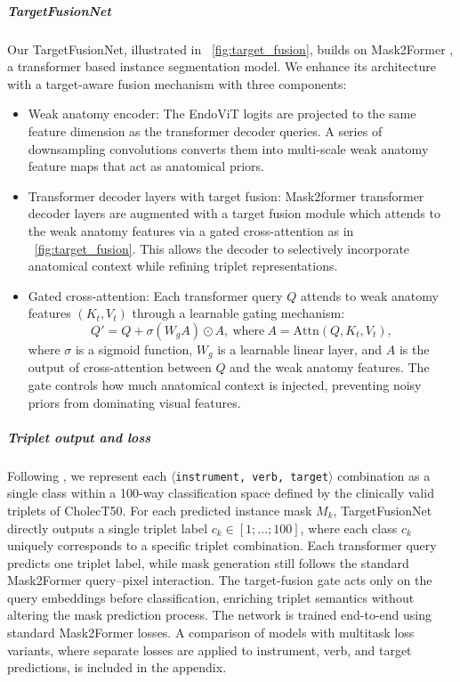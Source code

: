 \documentclass[pdflatex,sn-mathphys-num]{sn-jnl}%
\newcommand{\ivttriplet}{\texttt{$\langle$instrument, verb, target$\rangle$}\xspace}
\newcommand{\anatprior}{weak anatomy\xspace}
\newcommand{\Anatprior}{Weak anatomy\xspace}
\newcommand{\figref}[1]{\figurename~\ref{#1}}
\newcommand{\mysubsection}[1]{\subparagraph{#1}}
\theoremstyle{thmstyleone}%
\theoremstyle{thmstyletwo}%
\theoremstyle{thmstylethree}%
\begin{document}
\mysubsection{TargetFusionNet}\label{sec:targetfusionnet}
Our TargetFusionNet, illustrated in \figref{fig:target_fusion}, builds on Mask2Former \cite{cheng2022masked}, a transformer based instance segmentation model. 
We enhance its architecture with a target-aware fusion mechanism with three components:
%
\begin{itemize}
    \item \Anatprior encoder: The EndoViT logits are projected to the same feature dimension as the transformer decoder queries. A series of downsampling convolutions converts them into multi-scale \anatprior feature maps that act as anatomical priors.
    
    \item Transformer decoder layers with target fusion: Mask2former transformer decoder layers are augmented with a target fusion module which attends to the \anatprior features via a gated cross-attention as in \figref{fig:target_fusion}. This allows the decoder to selectively incorporate anatomical context while refining triplet representations.
    
    \item Gated cross-attention: Each transformer query \( Q \) attends to \anatprior features \( (K_t, V_t) \) through a learnable gating mechanism:
    \[
    Q' = Q + \sigma(W_g A) \odot A,
    ~ \mathrm{where} ~  A = \mathrm{Attn}(Q, K_t, V_t),
    \]
    where \( \sigma \) is a sigmoid function, \( W_g \) is a learnable linear layer, and \( A \) is the output of cross-attention between \( Q \) and the \anatprior features. The gate controls how much anatomical context is injected, preventing noisy priors from dominating visual features.

\end{itemize}
%



\mysubsection{Triplet output and loss}
Following \citet{nwoye2022rendezvous}, we represent each \ivttriplet combination as a single class within a 100-way classification space defined by the clinically valid triplets of CholecT50.
For each predicted instance mask $M_k$, TargetFusionNet directly outputs a single triplet label $c_k \in {[1; \dots; 100]}$, where each class $c_k$ uniquely corresponds to a specific triplet combination. 
Each transformer query predicts one triplet label, while mask generation still follows the standard Mask2Former query–pixel interaction. The target-fusion gate acts only on the query embeddings before classification, enriching triplet semantics without altering the mask prediction process.
The network is trained end-to-end using standard Mask2Former losses. A comparison  of models with multitask loss variants, where separate losses are applied to instrument, verb, and target predictions,  is included in the appendix.
\end{document}
